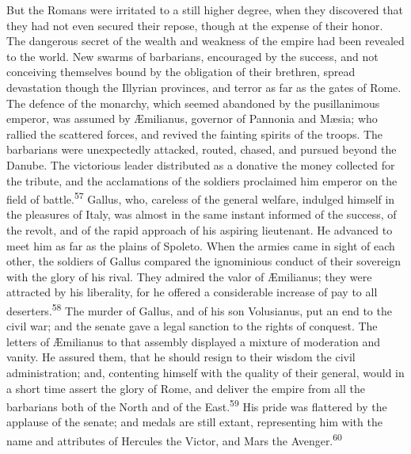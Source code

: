 

But the Romans were irritated to a still higher degree, when they
discovered that they had not even secured their repose, though at
the expense of their honor. The dangerous secret of the wealth
and weakness of the empire had been revealed to the world. New
swarms of barbarians, encouraged by the success, and not
conceiving themselves bound by the obligation of their brethren,
spread devastation though the Illyrian provinces, and terror as
far as the gates of Rome. The defence of the monarchy, which
seemed abandoned by the pusillanimous emperor, was assumed by
Æmilianus, governor of Pannonia and Mæsia; who rallied the
scattered forces, and revived the fainting spirits of the troops.
The barbarians were unexpectedly attacked, routed, chased, and
pursued beyond the Danube. The victorious leader distributed as a
donative the money collected for the tribute, and the
acclamations of the soldiers proclaimed him emperor on the field
of battle.\textsuperscript{57} Gallus, who, careless of the general welfare,
indulged himself in the pleasures of Italy, was almost in the
same instant informed of the success, of the revolt, and of the
rapid approach of his aspiring lieutenant. He advanced to meet
him as far as the plains of Spoleto. When the armies came in
sight of each other, the soldiers of Gallus compared the
ignominious conduct of their sovereign with the glory of his
rival. They admired the valor of Æmilianus; they were attracted
by his liberality, for he offered a considerable increase of pay
to all deserters.\textsuperscript{58} The murder of Gallus, and of his son
Volusianus, put an end to the civil war; and the senate gave a
legal sanction to the rights of conquest. The letters of
Æmilianus to that assembly displayed a mixture of moderation and
vanity. He assured them, that he should resign to their wisdom
the civil administration; and, contenting himself with the
quality of their general, would in a short time assert the glory
of Rome, and deliver the empire from all the barbarians both of
the North and of the East.\textsuperscript{59} His pride was flattered by the
applause of the senate; and medals are still extant, representing
him with the name and attributes of Hercules the Victor, and Mars
the Avenger.\textsuperscript{60}

